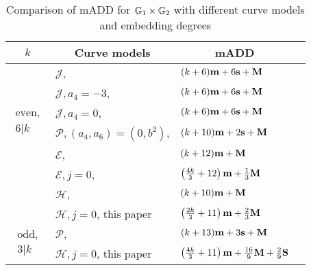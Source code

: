 \begin{table}[h]
\centering
\caption{Comparison of mADD for $\mathbb{G}_{1} \times \mathbb{G}_{2}$ with different curve models and embedding degrees}

\begin{tabular}{| l | l | l | l}
\hline
\multicolumn{1}{|c|}{$k$}
&\multicolumn{1}{|c|}{Curve models}	&\multicolumn{1}{c|}{mADD}	\\
\hline
\multicolumn{1}{|c|}{\multirow{6}{*}{
$\begin{array}{c} \text{even,} \\ 6|k \end{array}$}}
&$\mathcal{J}$, \cite{2008/IonicaJoux08} \cite{2009/fastertate}
		&$(k+ 6)\textbf{m} + 6\textbf{s} + \textbf{M} $	\\
&$\mathcal{J},a_4 = -3$, \cite{2009/fastertate}
	&$(k+ 6)\textbf{m} + 6\textbf{s} + \textbf{M}$	\\
&$\mathcal{J},a_4 = 0$, \cite{2009/fastertate}		
	&$(k + 6)\textbf{m} + 6\textbf{s} + \textbf{M}$	\\
&$\mathcal{P},(a_4,a_6) = (0, b^2)$, \cite{2009/craig}
		&$(k + 10)\textbf{m} + 2\textbf{s} + \textbf{M}$	\\
&$\mathcal{E}$, \cite{2009/fastertate}			
		&$(k+ 12)\textbf{m} + \textbf{M}$	\\
&$\mathcal{E},j=0$, \cite{2012/LWZ}
				&$\left(\frac{4k}{3} + 12\right)\textbf{m}  + \frac{1}{3}\textbf{M}$ \\
&$\mathcal{H}$, \cite{2010/Gu}	&$(k + 10)\textbf{m} + \textbf{M}$	\\
&$\mathcal{H},j=0$, this paper 	&
$ \left(\frac{2k}{3} + 11\right)\textbf{m} + \frac{2}{3}\textbf{M}$	\\
\hline
\multicolumn{1}{|c|}{\multirow{2}{*}{
$\begin{array}{c} \text{odd,} \\ 3|k \end{array}$}}
&$\mathcal{P}$, \cite{2010/CLN}		&$(k + 13)\textbf{m} + 3\textbf{s} + \textbf{M}$	\\
&$\mathcal{H},j=0$, this paper
&$\left(\frac{4k}{3} + 11\right)\textbf{m} + \frac{16}{9}\textbf{M} + \frac{2}{9}\textbf{S} $	\\
\hline
\end{tabular}
\label{tbl-cmp1a}


\end{table}

